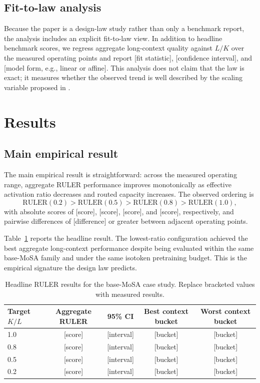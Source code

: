 \documentclass[11pt]{article}
\begin{document}
\subsection{Fit-to-law analysis}

Because the paper is a design-law study rather than only a benchmark report, the analysis includes an explicit fit-to-law view. In addition to headline benchmark scores, we regress aggregate long-context quality against $L/K$ over the measured operating points and report [fit statistic], [confidence interval], and [model form, e.g., linear or affine]. This analysis does not claim that the law is exact; it measures whether the observed trend is well described by the scaling variable proposed in .

\section{Results}
\label{sec:results}

\subsection{Main empirical result}

The main empirical result is straightforward: across the measured operating range, aggregate RULER performance improves monotonically as effective activation ratio decreases and routed capacity increases. The observed ordering is
\[
\text{RULER}(0.2) > \text{RULER}(0.5) > \text{RULER}(0.8) > \text{RULER}(1.0),
\]
with absolute scores of [score], [score], [score], and [score], respectively, and pairwise differences of [difference] or greater between adjacent operating points.

Table~\ref{tab:main_results} reports the headline result. The lowest-ratio configuration achieved the best aggregate long-context performance despite being evaluated within the same base-MoSA family and under the same isotoken pretraining budget. This is the empirical signature the design law predicts.

\begin{table}[H]
\centering
\caption{Headline RULER results for the base-MoSA case study. Replace bracketed values with measured results.}
\label{tab:main_results}
\begin{tabular}{lcccc}
\toprule
Target $K/L$ & Aggregate RULER & 95\% CI & Best context bucket & Worst context bucket \\
\midrule
1.0 & [score] & [interval] & [bucket] & [bucket] \\
0.8 & [score] & [interval] & [bucket] & [bucket] \\
0.5 & [score] & [interval] & [bucket] & [bucket] \\
0.2 & [score] & [interval] & [bucket] & [bucket] \\
\bottomrule
\end{tabular}
\end{table}
\end{document}
